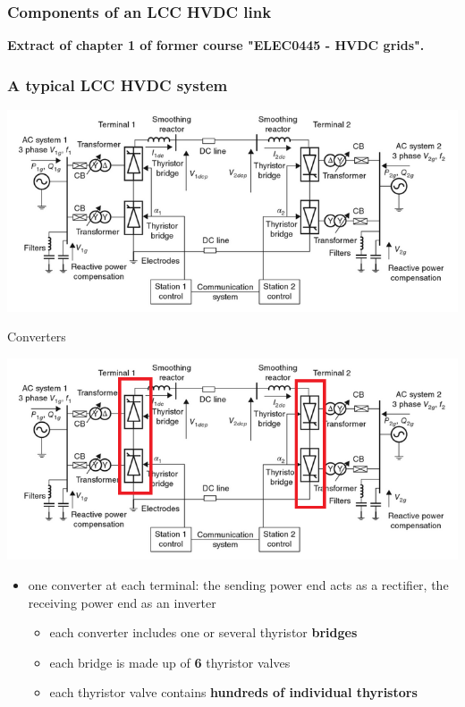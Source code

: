 \begin{frame}[fragile]
\frametitle{Components of an LCC HVDC link}
\begin{center}
\textbf{Extract of chapter 1 of former course "ELEC0445 - HVDC grids".}
\end{center}
\end{frame}

\begin{frame}
\frametitle{A typical LCC HVDC system}
\begin{center}
    \includegraphics[width=1.0\linewidth]{images/typical-HVDC.png}
\end{center}
\end{frame}

\begin{frame}{Converters}
\begin{center}
    \includegraphics[width=0.5\linewidth]{images/typical-HVDC1.png}
\end{center}
\begin{itemize}
    \item one converter at each terminal: the sending power end acts as a rectifier, the receiving power end as an inverter
    \begin{itemize}
        \item each converter includes one or several thyristor \textbf{bridges}
        \item each bridge is made up of \textbf{6} thyristor {valves}
        \item each thyristor valve contains \textbf{hundreds of individual thyristors}
    \end{itemize}
\end{itemize}
\end{frame}



